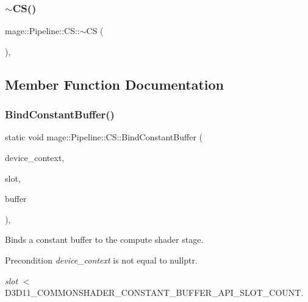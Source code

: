 \hypertarget{structmage_1_1_pipeline_1_1_c_s_a8061d73f9cc268ce883dd0fd3c9f094c}{}\label{structmage_1_1_pipeline_1_1_c_s_a8061d73f9cc268ce883dd0fd3c9f094c} 
\subsubsection{\texorpdfstring{$\sim$\+C\+S()}{~CS()}}
{\footnotesize\ttfamily mage\+::\+Pipeline\+::\+C\+S\+::$\sim$\+CS (\begin{DoxyParamCaption}{ }\end{DoxyParamCaption})\hspace{0.3cm}{\ttfamily [private]}, {\ttfamily [delete]}}



\subsection{Member Function Documentation}
\hypertarget{structmage_1_1_pipeline_1_1_c_s_a4c4045bc8cf532dd98f8a4325cf3b6e0}{}\label{structmage_1_1_pipeline_1_1_c_s_a4c4045bc8cf532dd98f8a4325cf3b6e0} 
\subsubsection{\texorpdfstring{Bind\+Constant\+Buffer()}{BindConstantBuffer()}}
{\footnotesize\ttfamily static void mage\+::\+Pipeline\+::\+C\+S\+::\+Bind\+Constant\+Buffer (\begin{DoxyParamCaption}\item[{I\+D3\+D11\+Device\+Context2 $\ast$}]{device\+\_\+context,  }\item[{\hyperlink{namespacemage_a41c104c036fba3756a74e19f793eeaa1}{U32}}]{slot,  }\item[{I\+D3\+D11\+Buffer $\ast$}]{buffer }\end{DoxyParamCaption})\hspace{0.3cm}{\ttfamily [static]}, {\ttfamily [noexcept]}}

Binds a constant buffer to the compute shader stage.

\begin{DoxyPrecond}{Precondition}
{\itshape device\+\_\+context} is not equal to {\ttfamily nullptr}. 

{\itshape slot} $<$ {\ttfamily D3\+D11\+\_\+\+C\+O\+M\+M\+O\+N\+S\+H\+A\+D\+E\+R\+\_\+\+C\+O\+N\+S\+T\+A\+N\+T\+\_\+\+B\+U\+F\+F\+E\+R\+\_\+\+A\+P\+I\+\_\+\+S\+L\+O\+T\+\_\+\+C\+O\+U\+NT}. 
\end{DoxyPrecond}

